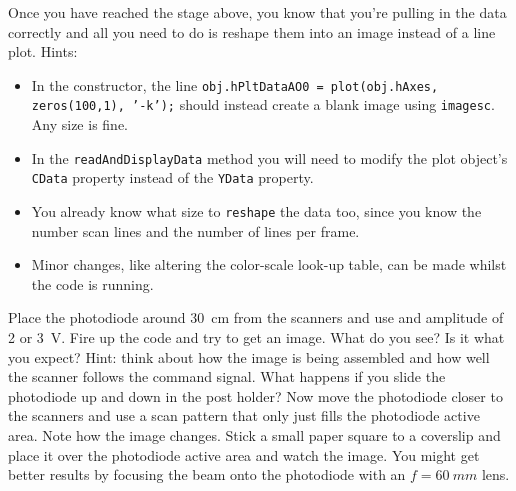 \documentclass[a4paper]{report}
\begin{document}
\noindent
Once you have reached the stage above, you know that you're pulling in the data correctly and all you need to do is reshape them into an image instead of a line plot.
Hints:
\begin{itemize}
    \setlength\itemsep{0.15em}
    \item In the constructor, the line \texttt{obj.hPltDataAO0 = plot(obj.hAxes, zeros(100,1), '-k');} should instead create a blank image using \texttt{imagesc}. Any size is fine.
    \item In the \texttt{readAndDisplayData} method you will need to modify the plot object's \texttt{CData} property instead of the \texttt{YData} property. 
    \item You already know what size to \texttt{reshape} the data too, since you know the number scan lines and the number of lines per frame.
    \item Minor changes, like altering the color-scale look-up table, can be made whilst the code is running.
\end{itemize}

\noindent
Place the photodiode around 30~cm from the scanners and use and amplitude of 2 or 3~V.
Fire up the code and try to get an image. 
What do you see?
Is it what you expect? Hint: think about how the image is being assembled and how well the scanner follows the command signal.
What happens if you slide the photodiode up and down in the post holder?
Now move the photodiode closer to the scanners and use a scan pattern that only just fills the photodiode active area. 
Note how the image changes. 
Stick a small paper square to a coverslip and place it over the photodiode active area and watch the image.
You might get better results by focusing the beam onto the photodiode with an $f=60~mm$ lens. 
\end{document}
